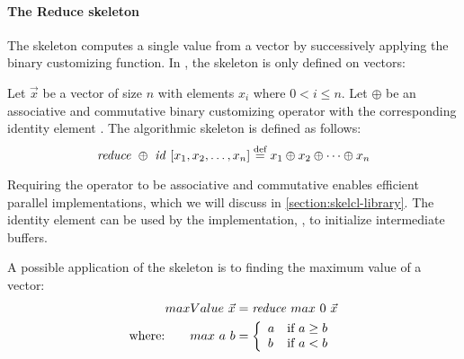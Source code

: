 \paragraph{The Reduce skeleton}
The \reduce skeleton computes a single value from a vector by successively applying the binary customizing function.
In \SkelCL, the \reduce skeleton is only defined on vectors:
\begin{definition}
  \label{definition:reduce}
  Let $\vec{x}$ be a vector of size $n$ with elements $x_i$ where $0 < i \leq n$.
  Let $\oplus$ be an associative and commutative binary customizing operator with the corresponding identity element \id.
  The algorithmic skeleton \reduce is defined as follows:
  \begin{equation*}
    \text{\textit{reduce}}\ \oplus\ \text{\textit{id}}\ [x_1, x_2, \dots, x_n]
      \stackrel{\textrm{\scriptsize def}}{=} x_1 \oplus x_2 \oplus \dots \oplus x_n
  \end{equation*}
\end{definition}
\noindent
Requiring the operator to be associative and commutative enables efficient parallel implementations, which we will discuss in \autoref{section:skelcl-library}.
The identity element \id can be used by the implementation, \eg, to initialize intermediate buffers.

A possible application of the \reduce skeleton is to finding the maximum value of a vector:
\begin{align*}
  maxValue\ \vec{x} &= \text{\textit{reduce}}\ max\ 0\ \vec{x}\\
  \text{where:} \qquad max\ a\ b &=
    \left\{
      \begin{array}{l l}
      a & \text{if } a \geq b\\
      b & \text{if } a < b
      \end{array}
    \right.
\end{align*}


